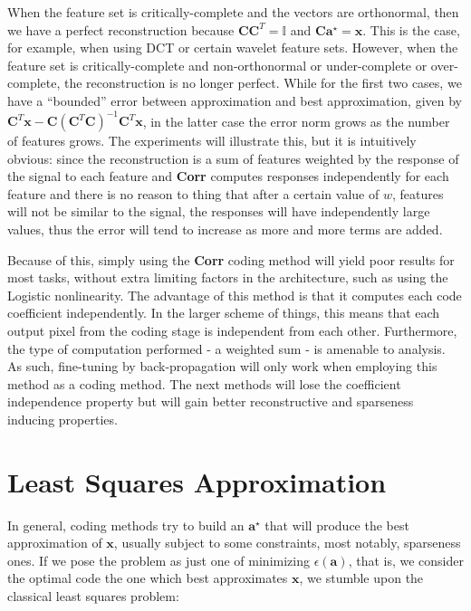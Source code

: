 \documentclass[12pt,a4paper,oneside,english]{UPBThesis}
\begin{document}
When the feature set is critically-complete and the vectors are orthonormal, then we have a perfect reconstruction because $\textbf{C}\textbf{C}^T = \mathbb{I}$ and $\textbf{C}\textbf{a}^\star = \textbf{x}$. This is the case, for example, when using DCT or certain wavelet feature sets. However, when the feature set is critically-complete and non-orthonormal or under-complete or over-complete, the reconstruction is no longer perfect. While for the first two cases, we have a ``bounded'' error between approximation and best approximation, given by $\textbf{C}^T\textbf{x} - \textbf{C}(\textbf{C}^T\textbf{C})^{-1}\textbf{C}^T\textbf{x}$, in the latter case the error norm grows as the number of features grows. The experiments will illustrate this, but it is intuitively obvious: since the reconstruction is a sum of features weighted by the response of the signal to each feature and \textbf{Corr} computes responses independently for each feature and there is no reason to thing that after a certain value of $w$, features will not be similar to the signal, the responses will have independently large values, thus the error will tend to increase as more and more terms are added.

Because of this, simply using the \textbf{Corr} coding method will yield poor results for most tasks, without extra limiting factors in the architecture, such as using the Logistic nonlinearity. The advantage of this method is that it computes each code coefficient independently. In the larger scheme of things, this means that each output pixel from the coding stage is independent from each other. Furthermore, the type of computation performed - a weighted sum - is amenable to analysis. As such, fine-tuning by back-propagation will only work when employing this method as a coding method. The next methods will lose the coefficient independence property but will gain better reconstructive and sparseness inducing properties.

\section{Least Squares Approximation}
\label{sec:LeastSquaresApproximation}

In general, coding methods try to build an $\textbf{a}^\star$ that will produce the best approximation of $\textbf{x}$, usually subject to some constraints, most notably, sparseness ones. If we pose the problem as just one of minimizing $\epsilon(\textbf{a})$, that is, we consider the optimal code the one which best approximates $\textbf{x}$, we stumble upon the classical least squares problem:
\end{document}

